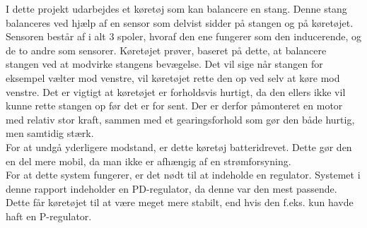 I dette projekt udarbejdes et køretøj som kan balancere en stang. Denne stang balanceres ved hjælp af en sensor som delvist sidder på stangen og på køretøjet. Sensoren består af i alt 3 spoler, hvoraf den ene fungerer som den inducerende, og de to andre som sensorer. Køretøjet prøver, baseret på dette, at balancere stangen ved at modvirke stangens bevægelse. Det vil sige når stangen for eksempel vælter mod venstre, vil køretøjet rette den op ved selv at køre mod venstre. Det er vigtigt at køretøjet er forholdsvis hurtigt, da den ellers ikke vil kunne rette stangen op før det er for sent. Der er derfor påmonteret en motor med relativ stor kraft, sammen med et gearingsforhold som gør den både hurtig, men samtidig stærk. \\

For at undgå yderligere modstand, er dette køretøj batteridrevet. Dette gør den en del mere mobil, da man ikke er afhængig af en strømforsyning. \\

For at dette system fungerer, er det nødt til at indeholde en regulator. Systemet i denne rapport indeholder en PD-regulator, da denne var den mest passende. Dette får køretøjet til at være meget mere stabilt, end hvis den f.eks. kun havde haft en P-regulator. \\

